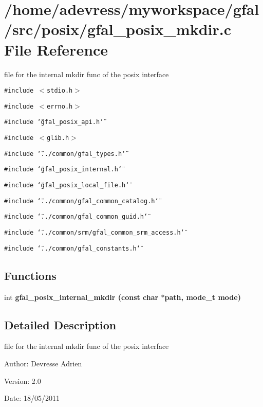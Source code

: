 \section{/home/adevress/myworkspace/gfal/src/posix/gfal\_\-posix\_\-mkdir.c File Reference}
\label{gfal__posix__mkdir_8c}
file for the internal mkdir func of the posix interface 

{\tt \#include $<$stdio.h$>$}\par
{\tt \#include $<$errno.h$>$}\par
{\tt \#include \char`\"{}gfal\_\-posix\_\-api.h\char`\"{}}\par
{\tt \#include $<$glib.h$>$}\par
{\tt \#include \char`\"{}../common/gfal\_\-types.h\char`\"{}}\par
{\tt \#include \char`\"{}gfal\_\-posix\_\-internal.h\char`\"{}}\par
{\tt \#include \char`\"{}gfal\_\-posix\_\-local\_\-file.h\char`\"{}}\par
{\tt \#include \char`\"{}../common/gfal\_\-common\_\-catalog.h\char`\"{}}\par
{\tt \#include \char`\"{}../common/gfal\_\-common\_\-guid.h\char`\"{}}\par
{\tt \#include \char`\"{}../common/srm/gfal\_\-common\_\-srm\_\-access.h\char`\"{}}\par
{\tt \#include \char`\"{}../common/gfal\_\-constants.h\char`\"{}}\par
\subsection*{Functions}
\begin{CompactItemize}
\item 
int \bf{gfal\_\-posix\_\-internal\_\-mkdir} (const char $\ast$path, mode\_\-t mode)
\end{CompactItemize}


\subsection{Detailed Description}
file for the internal mkdir func of the posix interface 

\begin{Desc}
\item[Author:]Devresse Adrien \end{Desc}
\begin{Desc}
\item[Version:]2.0 \end{Desc}
\begin{Desc}
\item[Date:]18/05/2011 \end{Desc}


